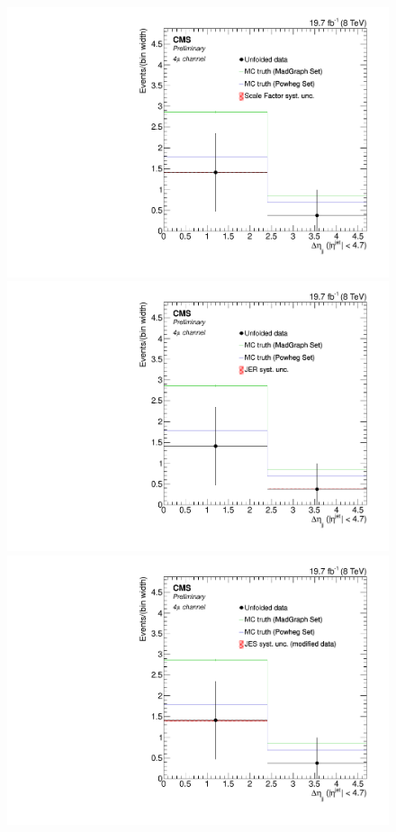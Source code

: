 \begin{figure}[hbtp]
\begin{center}
   \includegraphics[width=0.8\cmsFigWidth]{Figures/Unfolding/Systematics/ZZTo4m_Deta_SFSq_Mad_fr}
   \includegraphics[width=0.8\cmsFigWidth]{Figures/Unfolding/Systematics/ZZTo4m_Deta_JER_Mad_fr}
   \includegraphics[width=0.8\cmsFigWidth]{Figures/Unfolding/Systematics/ZZTo4m_Deta_JES_ModData_Mad_fr}     

\end{center}
\end{figure}
